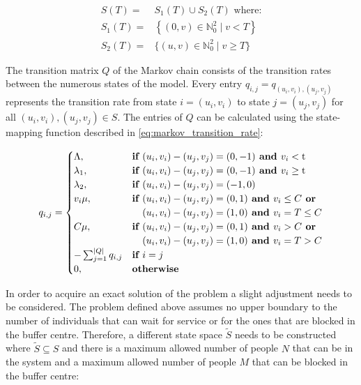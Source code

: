 \begin{align}
    S(T) =& S_1(T) \cup S_2(T) \text{ where:} \nonumber \\
    S_1(T) =& \left\{(0, v)\in\mathbb{N}_0^2 \; | \; v < T \right\} 
    \label{eq:state_space} \\
    S_2(T) =& \{(u, v)\in\mathbb{N}_0^2 \; | \; v \geq T \} \nonumber
\end{align}

The transition matrix \(Q\) of the Markov chain consists of the transition rates
between the numerous states of the model. Every entry \( q_{i,j} = 
q_{(u_i, v_i),(u_j, v_j)} \) represents the transition rate from state 
\( i = (u_i, v_i) \) to state \( j = (u_j , v_j) \) for all 
\( (u_i, v_i), (u_j, v_j) \in S \).
The entries of \(Q\) can be calculated using the state-mapping function 
described in \ref{eq:markov_transition_rate}: 

\begin{equation} \label{eq:markov_transition_rate}
    q_{i, j} = 
    \begin{cases}
        \Lambda, & \textbf{if } (u_i, v_i) - (u_j, v_j) = (0,-1) \textbf{ and } 
        v_i < \text{t} \\
        \lambda_1, & \textbf{if } (u_i, v_i) - (u_j, v_j) = (0,-1) \textbf{ and } 
        v_i \geq \text{t} \\
        \lambda_2, & \textbf{if } (u_i, v_i) - (u_j, v_j) = (-1,0) \\
        v_i \mu, & \textbf{if } (u_i, v_i) - (u_j, v_j) = (0,1) \textbf{ and } 
        v_i \leq C \textbf{ or} \\ & \hspace{0.37cm}(u_i, v_i) - (u_j, v_j) = (1,0) 
        \textbf{ and } v_i = T \leq C \\
        C \mu, & \textbf{if } (u_i, v_i) - (u_j, v_j) = (0,1) \textbf{ and } v_i > C 
        \textbf{ or} \\ & \hspace{0.37cm}(u_i, v_i) - (u_j, v_j) = (1,0) \textbf{ and } 
        v_i = T > C\\
        -\sum_{j=1}^{|Q|}{q_{i,j}} & \textbf{if } i = j \\
        0, & \textbf{otherwise}
    \end{cases}
\end{equation}


% 


In order to acquire an exact solution of the problem a slight adjustment needs to 
be considered. 
The problem defined above assumes no upper boundary to the number of individuals 
that can wait for service or for the ones that are blocked in the buffer centre. 
Therefore, a different state space \( \tilde S \) needs to be constructed where 
\( \tilde S \subseteq S \) and there is a maximum allowed number of people \(N\) 
that can be in the system and a maximum allowed number of people \(M\) that can
be blocked in the buffer centre:

